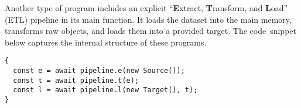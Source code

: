 Another type of program includes an explicit ``\textbf{E}xtract, \textbf{T}ransform, and \textbf{L}oad'' (ETL) pipeline in its main function. It loads the dataset into the main memory, transforms raw objects, and loads them into a provided target. The code~snippet below captures the internal structure of these programs.

\begin{verbatim}
{
  const e = await pipeline.e(new Source());
  const t = await pipeline.t(e);
  const l = await pipeline.l(new Target(), t);
}
\end{verbatim}
